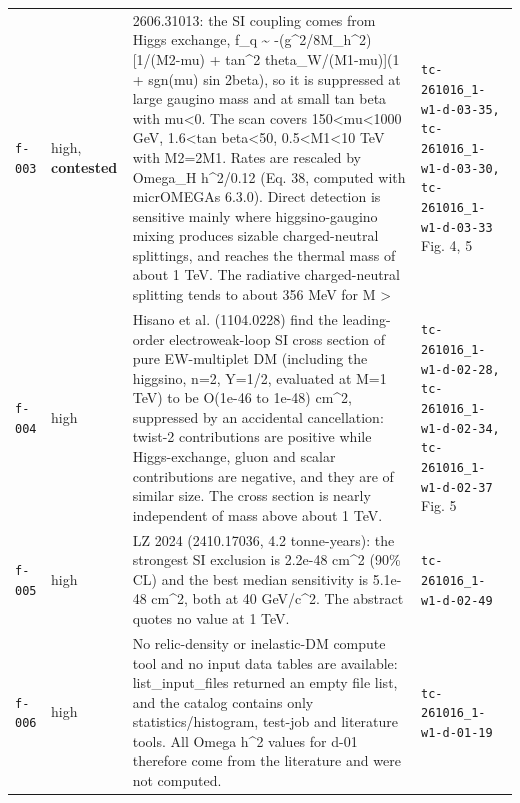 \documentclass[11pt,a4paper]{article}
\begin{document}
\begin{longtable}{@{}p{}p{}p{}p{}@{}}
\texttt{f-003} & high, \textbf{contested} & 2606.31013: the SI coupling comes from Higgs exchange, f\_q \textasciitilde{} -(g\textasciicircum{}2/8M\_h\textasciicircum{}2)[1/(M2-\textbar{}mu\textbar{}) + tan\textasciicircum{}2 theta\_W/(M1-\textbar{}mu\textbar{})](1 + sgn(mu) sin 2beta), so it is suppressed at large gaugino mass and at small tan beta with mu\textless{}0. The scan covers 150\textless{}\textbar{}mu\textbar{}\textless{}1000 GeV, 1.6\textless{}tan beta\textless{}50, 0.5\textless{}M1\textless{}10 TeV with M2=2M1. Rates are rescaled by Omega\_H h\textasciicircum{}2/0.12 (Eq. 38, computed with micrOMEGAs 6.3.0). Direct detection is sensitive mainly where higgsino-gaugino mixing produces sizable charged-neutral splittings, and reaches the thermal mass of about 1 TeV. The radiative charged-neutral splitting tends to about 356 MeV for M \textgreater{} & \texttt{tc-261016\_\allowbreak{}1-w1-d-03-35,\allowbreak{} tc-261016\_\allowbreak{}1-w1-d-03-30,\allowbreak{} tc-261016\_\allowbreak{}1-w1-d-03-33} Fig. 4, 5 \\
\texttt{f-004} & high & Hisano et al. (1104.0228) find the leading-order electroweak-loop SI cross section of pure EW-multiplet DM (including the higgsino, n=2, Y=1/2, evaluated at M=1 TeV) to be O(1e-46 to 1e-48) cm\textasciicircum{}2, suppressed by an accidental cancellation: twist-2 contributions are positive while Higgs-exchange, gluon and scalar contributions are negative, and they are of similar size. The cross section is nearly independent of mass above about 1 TeV. & \texttt{tc-261016\_\allowbreak{}1-w1-d-02-28,\allowbreak{} tc-261016\_\allowbreak{}1-w1-d-02-34,\allowbreak{} tc-261016\_\allowbreak{}1-w1-d-02-37} Fig. 5 \\
\texttt{f-005} & high & LZ 2024 (2410.17036, 4.2 tonne-years): the strongest SI exclusion is 2.2e-48 cm\textasciicircum{}2 (90\% CL) and the best median sensitivity is 5.1e-48 cm\textasciicircum{}2, both at 40 GeV/c\textasciicircum{}2. The abstract quotes no value at 1 TeV. & \texttt{tc-261016\_\allowbreak{}1-w1-d-02-49} \\
\texttt{f-006} & high & No relic-density or inelastic-DM compute tool and no input data tables are available: list\_input\_files returned an empty file list, and the catalog contains only statistics/histogram, test-job and literature tools. All Omega h\textasciicircum{}2 values for d-01 therefore come from the literature and were not computed. & \texttt{tc-261016\_\allowbreak{}1-w1-d-01-19} \\

\end{longtable}
\end{document}
